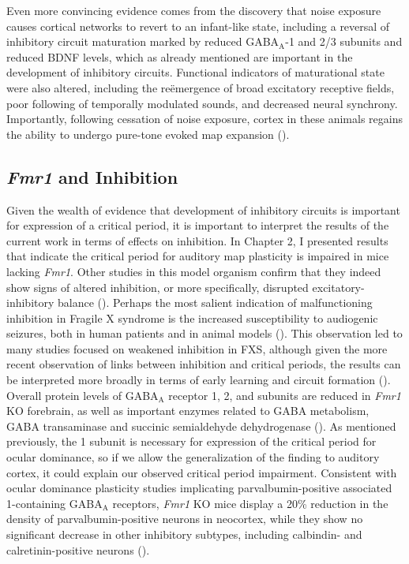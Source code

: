 Even more convincing evidence comes from the discovery that noise exposure causes cortical networks to revert to an infant-like state, including a reversal of inhibitory circuit maturation marked by reduced GABA$_\mathrm{A}$-\textalpha{}1 and \textbeta{}2/3 subunits and reduced BDNF levels, which as already mentioned are important in the development of inhibitory circuits. Functional indicators of maturational state were also altered, including the re\"emergence of broad excitatory receptive fields, poor following of temporally modulated sounds, and decreased neural synchrony. Importantly, following cessation of noise exposure, cortex in these animals regains the ability to undergo pure-tone evoked map expansion (\cite{Zhou2011}).

\subsection{\textit{Fmr1} and Inhibition}
Given the wealth of evidence that development of inhibitory circuits is important for expression of a critical period, it is important to interpret the results of the current work in terms of effects on inhibition. In Chapter 2, I presented results that indicate the critical period for auditory map plasticity is impaired in mice lacking \textit{Fmr1}. Other studies in this model organism confirm that they indeed show signs of altered inhibition, or more specifically, disrupted excitatory-inhibitory balance (\cite{Gibson2008}). Perhaps the most salient indication of malfunctioning inhibition in Fragile X syndrome is the increased susceptibility to audiogenic seizures, both in human patients and in animal models (\cite{Hagerman, Chen2001}). This observation led to many studies focused on weakened inhibition in FXS, although given the more recent observation of links between inhibition and critical periods, the results can be interpreted more broadly in terms of early learning and circuit formation (\cite{ElIdrissi2005}). Overall protein levels of GABA$_\mathrm{A}$ receptor \textalpha{}1, \textbeta{}2, and \textdelta{} subunits are reduced in \textit{Fmr1} KO forebrain, as well as important enzymes related to GABA metabolism, GABA transaminase and succinic semialdehyde dehydrogenase (\cite{Adusei2010}). As mentioned previously, the \textalpha{}1 subunit is necessary for expression of the critical period for ocular dominance, so if we allow the generalization of the finding to auditory cortex, it could explain our observed critical period impairment. Consistent with ocular dominance plasticity studies implicating parvalbumin-positive associated \textalpha{}1-containing GABA$_\mathrm{A}$ receptors, \textit{Fmr1} KO mice display a 20\% reduction in the density of parvalbumin-positive neurons in neocortex, while they show no significant decrease in other inhibitory subtypes, including calbindin- and calretinin-positive neurons (\cite{Selby2007}).

